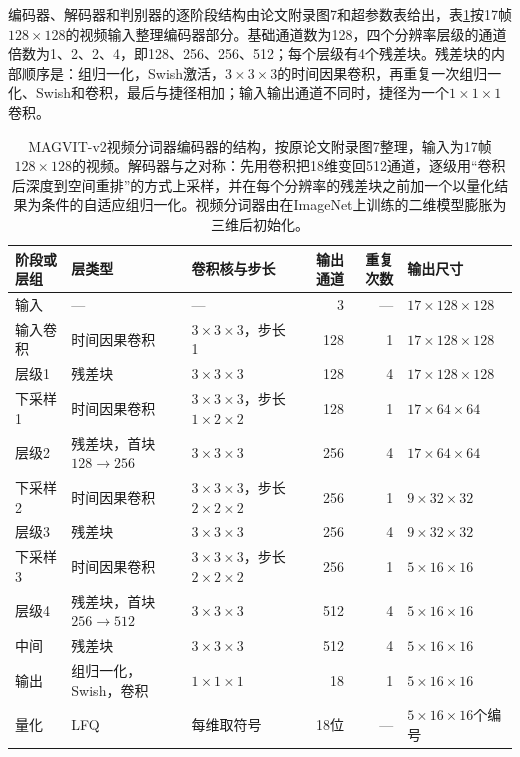 编码器、解码器和判别器的逐阶段结构由论文附录图7和超参数表给出，表\ref{tab:vision-ivm-magvit2-layers}按17帧$128\times128$的视频输入整理编码器部分。基础通道数为128，四个分辨率层级的通道倍数为1、2、2、4，即128、256、256、512；每个层级有4个残差块。残差块的内部顺序是：组归一化，Swish激活，$3\times3\times3$的时间因果卷积，再重复一次组归一化、Swish和卷积，最后与捷径相加；输入输出通道不同时，捷径为一个$1\times1\times1$卷积。

\begin{table}[tbp]
  \centering
  \small
  \begin{tabularx}{\linewidth}{@{}llXrrl@{}}
    \toprule
    阶段或层组 & 层类型 & 卷积核与步长 & 输出通道 & 重复次数 & 输出尺寸\\
    \midrule
    输入 & — & — & 3 & — & $17\times128\times128$\\
    输入卷积 & 时间因果卷积 & $3\times3\times3$，步长1 & 128 & 1 & $17\times128\times128$\\
    层级1 & 残差块 & $3\times3\times3$ & 128 & 4 & $17\times128\times128$\\
    下采样1 & 时间因果卷积 & $3\times3\times3$，步长$1\times2\times2$ & 128 & 1 & $17\times64\times64$\\
    层级2 & 残差块，首块$128\to256$ & $3\times3\times3$ & 256 & 4 & $17\times64\times64$\\
    下采样2 & 时间因果卷积 & $3\times3\times3$，步长$2\times2\times2$ & 256 & 1 & $9\times32\times32$\\
    层级3 & 残差块 & $3\times3\times3$ & 256 & 4 & $9\times32\times32$\\
    下采样3 & 时间因果卷积 & $3\times3\times3$，步长$2\times2\times2$ & 256 & 1 & $5\times16\times16$\\
    层级4 & 残差块，首块$256\to512$ & $3\times3\times3$ & 512 & 4 & $5\times16\times16$\\
    中间 & 残差块 & $3\times3\times3$ & 512 & 4 & $5\times16\times16$\\
    输出 & 组归一化，Swish，卷积 & $1\times1\times1$ & 18 & 1 & $5\times16\times16$\\
    量化 & LFQ & 每维取符号 & 18位 & — & $5\times16\times16$个编号\\
    \bottomrule
  \end{tabularx}
  \caption{MAGVIT-v2视频分词器编码器的结构，按原论文附录图7整理，输入为17帧$128\times128$的视频。解码器与之对称：先用卷积把18维变回512通道，逐级用“卷积后深度到空间重排”的方式上采样，并在每个分辨率的残差块之前加一个以量化结果为条件的自适应组归一化。视频分词器由在ImageNet上训练的二维模型膨胀为三维后初始化。}
  \label{tab:vision-ivm-magvit2-layers}
\end{table}

